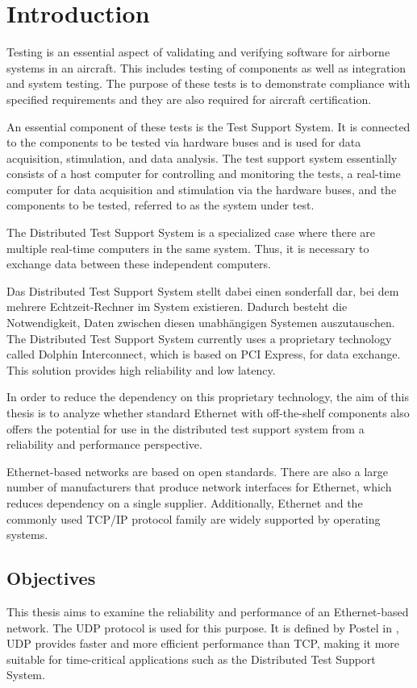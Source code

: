 \chapter{Introduction} \label{chap:introduction}
Testing is an essential aspect of validating and verifying software for airborne systems in an aircraft. This includes testing of components as well as integration and system testing. The purpose of these tests is to demonstrate compliance with specified requirements and they are also required for aircraft certification.

An essential component of these tests is the Test Support System. It is connected to the components to be tested via hardware buses and is used for data acquisition, stimulation, and data analysis. The test support system essentially consists of a host computer for controlling and monitoring the tests, a real-time computer for data acquisition and stimulation via the hardware buses, and the components to be tested, referred to as the system under test.

The Distributed Test Support System is a specialized case where there are multiple real-time computers in the same system. Thus, it is necessary to exchange data between these independent computers.

Das Distributed Test Support System stellt dabei einen sonderfall dar, bei dem mehrere Echtzeit-Rechner im System existieren. Dadurch besteht die Notwendigkeit, Daten zwischen diesen unabhängigen Systemen auszutauschen. The Distributed Test Support System currently uses a proprietary technology called Dolphin Interconnect, which is based on PCI Express, for data exchange. This solution provides high reliability and low latency.

In order to reduce the dependency on this proprietary technology, the aim of this thesis is to analyze whether standard Ethernet with off-the-shelf components also offers the potential for use in the distributed test support system from a reliability and performance perspective.

Ethernet-based networks are based on open standards. There are also a large number of manufacturers that produce network interfaces for Ethernet, which reduces dependency on a single supplier. Additionally, Ethernet and the commonly used TCP/IP protocol family are widely supported by operating systems.


\section{Objectives} \label{chap:introduction:research_questions}
This thesis aims to examine the reliability and performance of an Ethernet-based network. The UDP protocol is used for this purpose. It is defined by Postel in \cite{introRelW04}, UDP provides faster and more efficient performance than TCP, making it more suitable for time-critical applications such as the Distributed Test Support System.

